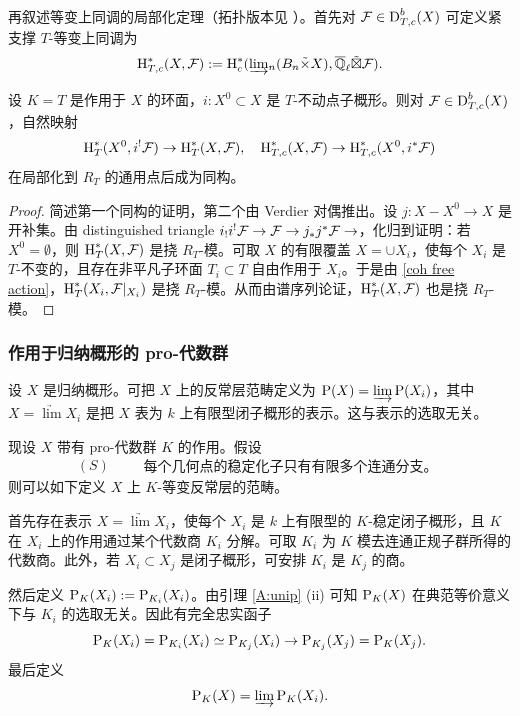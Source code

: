 再叙述等变上同调的局部化定理（拓扑版本见 \cite[(6.2)]{GKM}）。首先对 ${\mathcal F}\in \operatorname{D}_{T,c}^b(X)$ 可定义紧支撑 $T$-等变上同调为
\[\operatorname{H}_{T,c}^*(X,{\mathcal F}):=\operatorname{H}_c^*(\underrightarrow\lim_n (B_n\tilde\times X), {\overline{{\mathbb Q}}_\ell}\tilde\boxtimes {\mathcal F}).\]

\begin{thm}\label{equiv localization}
设 $K=T$ 是作用于 $X$ 的环面，$i:X^0\subset X$ 是 $T$-不动点子概形。则对 ${\mathcal F}\in\operatorname{D}_{T,c}^b(X)$，自然映射
\[\operatorname{H}^*_T(X^0,i^!{\mathcal F})\to \operatorname{H}^*_T(X,{\mathcal F}),\quad \operatorname{H}^*_{T,c}(X,{\mathcal F})\to \operatorname{H}^*_{T,c}(X^0,i^*{\mathcal F})\]
在局部化到 $R_{T}$ 的通用点后成为同构。
\end{thm}

\begin{proof}
简述第一个同构的证明，第二个由 Verdier 对偶推出。设 $j: X-X^0\to X$ 是开补集。由 distinguished triangle $i_!i^!{\mathcal F}\to {\mathcal F}\to j_*j^*{\mathcal F}\to$，化归到证明：若 $X^0=\emptyset$，则 $\operatorname{H}^*_T(X,{\mathcal F})$ 是挠 $R_T$-模。可取 $X$ 的有限覆盖 $X=\cup X_i$，使每个 $X_i$ 是 $T$-不变的，且存在非平凡子环面 $T_i\subset T$ 自由作用于 $X_i$。于是由 \eqref{coh free action}，$\operatorname{H}^*_T(X_i,{\mathcal F}|_{X_i})$ 是挠 $R_T$-模。从而由谱序列论证，$\operatorname{H}^*_T(X,{\mathcal F})$ 也是挠 $R_T$-模。
\end{proof}

\subsubsection{作用于归纳概形的 pro-代数群}\label{A:ind}
设 $X$ 是归纳概形。可把 $X$ 上的反常层范畴定义为 $\operatorname{P}(X)=\underrightarrow\lim\operatorname{P}(X_i)$，其中 $X=\underrightarrow\lim X_i$ 是把 $X$ 表为 $k$ 上有限型闭子概形的表示。这与表示的选取无关。

现设 $X$ 带有 pro-代数群 $K$ 的作用。假设
\[(S)\quad\quad \left.\begin{array}{c}\mbox{每个几何点的稳定化子只有有限多个连通分支。}\end{array}\right.\]
则可以如下定义 $X$ 上 $K$-等变反常层的范畴。

首先存在表示 $X=\underrightarrow\lim X_i$，使每个 $X_i$ 是 $k$ 上有限型的 $K$-稳定闭子概形，且 $K$ 在 $X_i$ 上的作用通过某个代数商 $K_i$ 分解。可取 $K_i$ 为 $K$ 模去连通正规子群所得的代数商。此外，若 $X_i\subset X_j$ 是闭子概形，可安排 $K_i$ 是 $K_j$ 的商。

然后定义 $\operatorname{P}_K(X_i):=\operatorname{P}_{K_i}(X_i)$。由引理 \ref{A:unip} (ii) 可知 $\operatorname{P}_K(X)$ 在典范等价意义下与 $K_i$ 的选取无关。因此有完全忠实函子
\[\operatorname{P}_K(X_i)=\operatorname{P}_{K_i}(X_i)\simeq \operatorname{P}_{K_j}(X_i)\to \operatorname{P}_{K_j}(X_j)=\operatorname{P}_K(X_j).\]
最后定义
\[\operatorname{P}_K(X)=\underrightarrow\lim \operatorname{P}_K(X_i).\]

